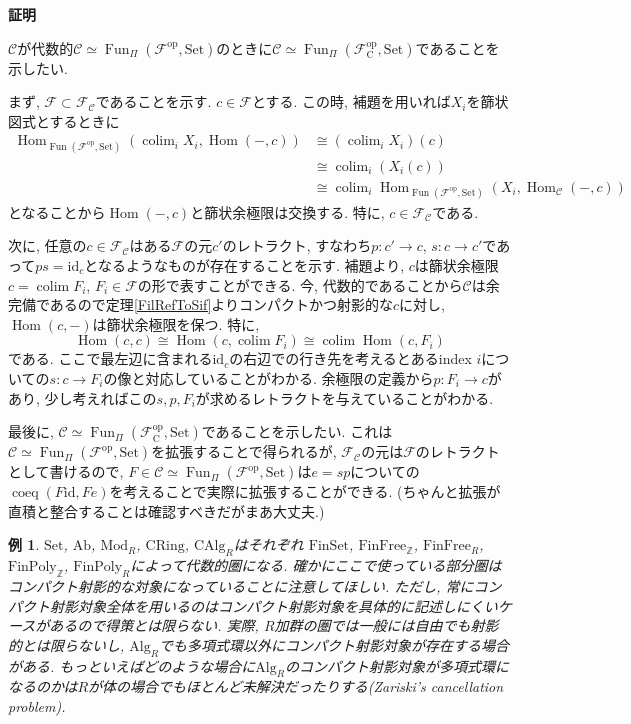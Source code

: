 \documentclass{ltjsarticle}
\makeatletter
\theoremstyle{mystyle}
\newtheorem{ex}[theorem]{例}       %
\renewcommand{\proofname}{\textbf{証明}}
\renewenvironment{proof}[1][\proofname]{\par
  \pushQED{\qed}
  \normalfont \topsep6\p@\@plus6\p@\relax
  \trivlist
  \item\relax
  {#1\@addpunct{\newline\ignorespaces}}%
}{
  \popQED\endtrivlist\@endpefalse
}
\DeclareMathOperator{\Hom}{Hom}
\DeclareMathOperator{\Fun}{Fun}
\DeclareMathOperator{\colim}{colim}
\makeatother
\begin{document}
\begin{proof}
  $\mathcal C$が代数的$\mathcal C\simeq\Fun_{\Pi}(\mathcal F^{\mathrm{op}},\mathrm{Set})$のときに$\mathcal C\simeq\Fun_{\Pi}(\mathcal F_{\mathrm{C}}^{\mathrm{op}},\mathrm{Set})$であることを示したい.

  まず, $\mathcal F\subset\mathcal F_{\mathcal C}$であることを示す.
  $c\in\mathcal F$とする. この時, 補題を用いれば$X_i$を篩状図式とするときに
  \begin{align*}
  \Hom_{\Fun(\mathcal F^{\mathrm{op}},\mathrm{Set})}(\colim_i X_i,\Hom(-,c))&\cong(\colim_i X_i)(c)\\
  &\cong\colim_i (X_i(c))\\
  &\cong\colim_i\Hom_{\Fun(\mathcal F^{\mathrm{op}},\mathrm{Set})}(X_i,\Hom_{\mathcal C}(-,c))
  \end{align*}
  となることから$\Hom(-,c)$と篩状余極限は交換する. 特に, $c\in\mathcal F_{\mathcal C}$である.

  次に, 任意の$c\in\mathcal F_{\mathcal C}$はある$\mathcal F$の元$c'$のレトラクト, すなわち$p:c'\to c$, $s:c\to c'$であって$ps=\mathrm{id}_{c}$となるようなものが存在することを示す.
  補題より,  $c$は篩状余極限$c=\colim F_i$, $F_i\in\mathcal F$の形で表すことができる.
  今, 代数的であることから$\mathcal C$は余完備であるので定理\ref{FilRefToSif}よりコンパクトかつ射影的な$c$に対し, $\Hom(c,-)$は篩状余極限を保つ.
  特に, 
  \[\Hom(c,c)\cong\Hom(c,\colim F_i)\cong\colim\Hom(c,F_i)\]
  である. ここで最左辺に含まれる$\mathrm{id}_{c}$の右辺での行き先を考えるとあるindex $i$についての$s:c\to F_i$の像と対応していることがわかる.
  余極限の定義から$p:F_i\to c$があり, 少し考えればこの$s,p,F_i$が求めるレトラクトを与えていることがわかる.

  最後に, $\mathcal C\simeq\Fun_{\Pi}(\mathcal F_{\mathrm{C}}^{\mathrm{op}},\mathrm{Set})$であることを示したい.
  これは$\mathcal C\simeq\Fun_{\Pi}(\mathcal F^{\mathrm{op}},\mathrm{Set})$を拡張することで得られるが, $\mathcal F_{\mathcal C}$の元は$\mathcal F$のレトラクトとして書けるので, 
  $F\in \mathcal C\simeq\Fun_{\Pi}(\mathcal F^{\mathrm{op}},\mathrm{Set})$は$e=sp$についての$\operatorname{coeq}(F\mathrm{id},Fe)$を考えることで実際に拡張することができる.
  (ちゃんと拡張が直積と整合することは確認すべきだがまあ大丈夫.)
\end{proof}
\begin{ex}
$\mathrm{Set}$, $\mathrm{Ab}$, $\mathrm{Mod}_R$, $\mathrm{CRing}$, $\mathrm{CAlg}_R$はそれぞれ
$\mathrm{FinSet}$, $\mathrm{FinFree}_{\mathbb Z}$, $\mathrm{FinFree}_{R}$, $\mathrm{FinPoly}_{\mathbb Z}$, $\mathrm{FinPoly}_{R}$によって代数的圏になる.
確かにここで使っている部分圏はコンパクト射影的な対象になっていることに注意してほしい.
ただし, 常にコンパクト射影対象全体を用いるのはコンパクト射影対象を具体的に記述しにくいケースがあるので得策とは限らない.
実際, $R$加群の圏では一般には自由でも射影的とは限らないし, $\mathrm{Alg}_R$でも多項式環以外にコンパクト射影対象が存在する場合がある.
もっといえばどのような場合に$\mathrm{Alg}_R$のコンパクト射影対象が多項式環になるのかは$R$が体の場合でもほとんど未解決だったりする(Zariski's cancellation problem)\cite{CptProj}.  
\end{ex}
\end{document}
